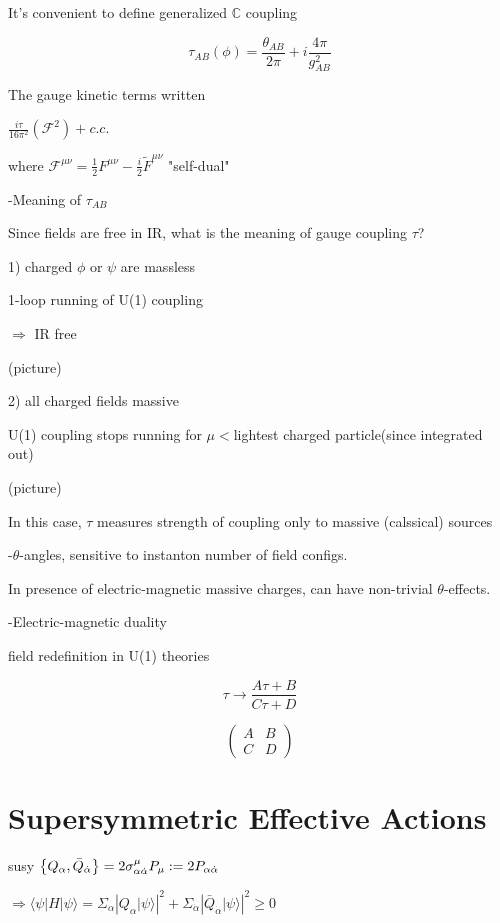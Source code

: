\documentclass[type = bachelor]{fduthesis-en}
\begin{document}
It's convenient to define generalized $\mathbb{C}$ coupling

$$\tau_{AB}(\phi)=\frac{\theta_{AB}}{2\pi}+i\frac{4\pi}{g_{AB}^2}$$

The gauge kinetic terms written 

$\frac{i\tau}{16\pi^2}(\mathcal{F}^2)+c.c.$

where $\mathcal{F}^{\mu\nu}=\frac{1}{2}F^{\mu\nu}-\frac{i}{2}\tilde{F}^{\mu\nu}$ "self-dual"

\bigskip
-Meaning of $\tau_{AB}$

Since fields are free in IR, what is the meaning of gauge coupling $\tau$?

1) charged $\phi$ or $\psi$ are massless

1-loop running of U(1) coupling 

$\Rightarrow$ IR free

\bigskip
(picture)

2) all charged fields massive 

U(1) coupling stops running for $\mu<$lightest charged particle(since integrated out)

\bigskip
(picture)

In this case, $\tau$ measures strength of coupling only to massive (calssical) sources

\bigskip
-$\theta$-angles, sensitive to instanton number of field configs.

In presence of electric-magnetic massive charges, can have non-trivial $\theta$-effects.

\bigskip
-Electric-magnetic duality

field redefinition in U(1) theories

$$\tau\rightarrow\frac{A\tau+B}{C\tau+D}$$ 

\[
\left(
\begin{array}{cc}
A & B \\
C & D 
\end{array}
\right)
\] 

\section{Supersymmetric Effective Actions}
susy $\acomm{Q_{\alpha}}{\bar{Q}_{\dot{\alpha}}}=2\sigma^{\mu}_{\alpha\dot{\alpha}}P_{\mu}:=2P_{\alpha\dot{\alpha}}$

$\Rightarrow  \langle\psi|H|\psi\rangle = \Sigma_{\alpha}\left|Q_{\alpha}|\psi\rangle\right|^2+\Sigma_{\dot{\alpha}}\left|\bar{Q}_{\dot{\alpha}}|\psi\rangle\right|^2 \geq 0$
\end{document}
